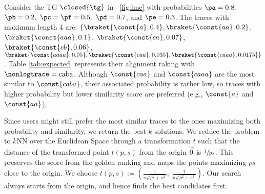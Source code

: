 \begin{table}[!t]
	\vspace{5mm}
	\centering
	\caption{Golden ranking of $\ptraces{\closed{\tg}}{0}$ with maximum length $4$, where $\logtrace=\const{caba}$ and $c=5$.}\label{tab:expected}
\end{table}
\begin{example}\label{ex:rankingTaus}
	Consider the TG $\closed{\tg}$ in \figurename~\ref{fig:lmc} with probabilities
	$\pa=0.8$, $\pb=0.2$, $\pc=\pf=0.5$, $\pd=0.7$, and $\pe=0.3$. The traces with maximum length $4$ are:
	$\{\braket{\const{a},0.4},\braket{\const{aa},0.2}$, $\braket{\const{aaa},0.1}$, $\braket{\const{ca},0.07}$, 
	$\braket{\const{cb},0.06}$,
	$\braket{\const{aaaa},0.05},\braket{\const{caa},0.035},\braket{\const{caaa},0.0175}\}$. 
	Table \ref{tab:expected} represents their alignment raking with  $\nonlogtrace=\textup{caba}$.  Although $\const{caa}$ and 
	$\const{caaa}$ are the most similar to $\const{caba}$, their associated probability  is rather low, so traces with 
	higher probability but lower similarity score are preferred (e.g., $\const{a}$ and $\const{aa}$).
\end{example}
%
{Since users might still prefer the most similar traces to the ones maximizing both probability and similarity, we 
	return the best $k$ solutions.
	We reduce the problem to $k$NN over the Euclidean Space through a transformation $t$ such that the distance of the 
	transformed point $t(p,s)$ from  the origin $\vec{0}$ is $\sfrac{1}{ps}$. This preserves the score from the golden ranking 
	and maps the points maximizing $ps$ close to the origin. We choose}
$t(p,s):=\left(\frac{1}{s\sqrt{p^2+s^2}},\; \frac{1}{p\sqrt{p^2+s^2}}\right)$. 
Our search always starts from the origin, and hence finds the best candidates first.

